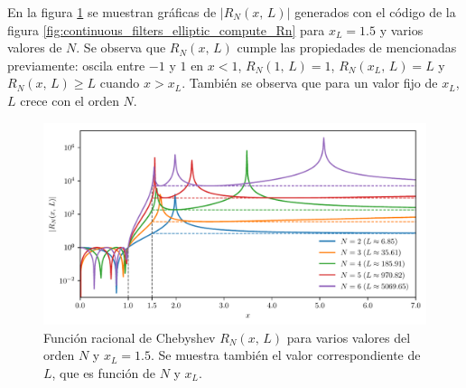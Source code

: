 \documentclass[a4paper]{report}
\begin{document}
En la figura \ref{fig:continuous_filters_elliptic_design_Rn} se muestran gráficas de \(|R_N(x,\,L)|\) generados con el código de la figura \ref{fig:continuous_filters_elliptic_compute_Rn} para \(x_L=1.5\) y varios valores de \(N\). Se observa que \(R_N(x,\,L)\) cumple las propiedades de mencionadas previamente: oscila entre \(-1\) y \(1\) en \(x<1\), \(R_N(1,\,L)=1\), \(R_N(x_L,\,L)=L\) y \(R_N(x,\,L)\geq L\) cuando \(x>x_L\). También se observa que para un valor fijo de \(x_L\), \(L\) crece con el orden \(N\).  
\begin{figure}[!htb]
 \begin{center}
 \includegraphics[width=1\textwidth]{figuras/continuous_filters_elliptic_design_Rn.pdf}
 \caption{\label{fig:continuous_filters_elliptic_design_Rn} Función racional de Chebyshev \(R_N(x,\,L)\) para varios valores del orden \(N\) y \(x_L=1.5\). Se muestra también el valor correspondiente de \(L\), que es función de \(N\) y \(x_L\).}
 \end{center}
\end{figure}
\end{document}
